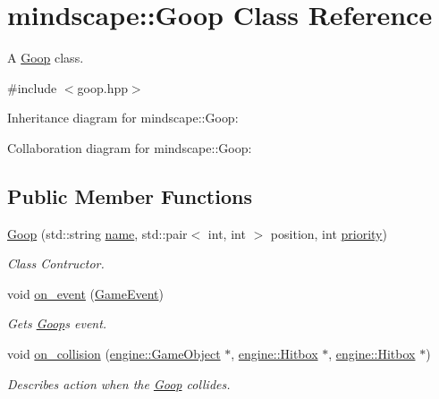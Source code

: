 \hypertarget{classmindscape_1_1_goop}{}\section{mindscape\+:\+:Goop Class Reference}
\label{classmindscape_1_1_goop}


A \hyperlink{classmindscape_1_1_goop}{Goop} class.  




{\ttfamily \#include $<$goop.\+hpp$>$}



Inheritance diagram for mindscape\+:\+:Goop\+:


Collaboration diagram for mindscape\+:\+:Goop\+:
\subsection*{Public Member Functions}
\begin{DoxyCompactItemize}
\item 
\hyperlink{classmindscape_1_1_goop_a2875ad29c31b4f038c91048c2599630a}{Goop} (std\+::string \hyperlink{classengine_1_1_game_object_a1f104f7af4f351e6d3278319762c9fe5}{name}, std\+::pair$<$ int, int $>$ position, int \hyperlink{classengine_1_1_game_object_a159ecaca30229e302793b11a75bd13c2}{priority})
\begin{DoxyCompactList}\small\item\em Class Contructor. \end{DoxyCompactList}\item 
void \hyperlink{classmindscape_1_1_goop_af4f468308a49c1055063dede23688eaf}{on\+\_\+event} (\hyperlink{class_game_event}{Game\+Event})
\begin{DoxyCompactList}\small\item\em Gets \hyperlink{classmindscape_1_1_goop}{Goop}\textquotesingle{}s event. \end{DoxyCompactList}\item 
void \hyperlink{classmindscape_1_1_goop_ad3c2ddd5849565484fa4ffeaf3fd8e42}{on\+\_\+collision} (\hyperlink{classengine_1_1_game_object}{engine\+::\+Game\+Object} $\ast$, \hyperlink{classengine_1_1_hitbox}{engine\+::\+Hitbox} $\ast$, \hyperlink{classengine_1_1_hitbox}{engine\+::\+Hitbox} $\ast$)
\begin{DoxyCompactList}\small\item\em Describes action when the \hyperlink{classmindscape_1_1_goop}{Goop} collides. \end{DoxyCompactList}\end{DoxyCompactItemize}
